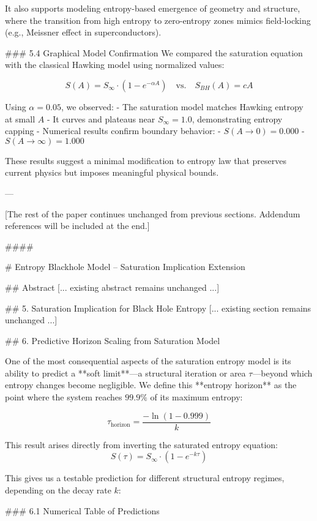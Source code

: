 It also supports modeling entropy-based emergence of geometry and structure, where the transition from high entropy to zero-entropy zones mimics field-locking (e.g., Meissner effect in superconductors).

### 5.4 Graphical Model Confirmation
We compared the saturation equation with the classical Hawking model using normalized values:

\[
S(A) = S_{\infty} \cdot \left(1 - e^{-\alpha A} \right) \quad \text{vs.} \quad S_{BH}(A) = cA
\]

Using \( \alpha = 0.05 \), we observed:
- The saturation model matches Hawking entropy at small \( A \)
- It curves and plateaus near \( S_{\infty} = 1.0 \), demonstrating entropy capping
- Numerical results confirm boundary behavior:
  - \( S(A \to 0) = 0.000 \)
  - \( S(A \to \infty) = 1.000 \)

These results suggest a minimal modification to entropy law that preserves current physics but imposes meaningful physical bounds.

---

[The rest of the paper continues unchanged from previous sections. Addendum references will be included at the end.]


####


# Entropy Blackhole Model – Saturation Implication Extension

## Abstract
[... existing abstract remains unchanged ...]

## 5. Saturation Implication for Black Hole Entropy
[... existing section remains unchanged ...]

## 6. Predictive Horizon Scaling from Saturation Model

One of the most consequential aspects of the saturation entropy model is its ability to predict a **soft limit**—a structural iteration or area \( \tau \)—beyond which entropy changes become negligible. We define this **entropy horizon** as the point where the system reaches \( 99.9\% \) of its maximum entropy:

\[
\tau_{\text{horizon}} = \frac{-\ln(1 - 0.999)}{k}
\]

This result arises directly from inverting the saturated entropy equation:
\[
S(\tau) = S_{\infty} \cdot \left(1 - e^{-k \tau} \right)
\]

This gives us a testable prediction for different structural entropy regimes, depending on the decay rate \( k \):

### 6.1 Numerical Table of Predictions

